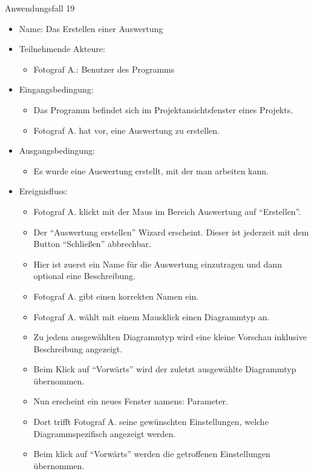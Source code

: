 \begin{description}
\item[Anwendungsfall 19]
\end{description}
 
\begin{itemize}
\item Name: Das Erstellen einer Auswertung
\item Teilnehmende Akteure:
\begin{itemize}
\item Fotograf A.: Benutzer des Programms
\end{itemize}
\item Eingangsbedingung:
\begin{itemize}
\item Das Programm befindet sich im Projektansichtsfenster eines Projekts.
\item Fotograf A. hat vor, eine Auswertung zu erstellen.
\end{itemize}
\item Ausgangsbedingung:
\begin{itemize}
\item Es wurde eine Auswertung erstellt, mit der man arbeiten kann.
\end{itemize}
\item Ereignisfluss:
\begin{itemize}
\item Fotograf A. klickt mit der Maus im Bereich Auswertung auf "`Erstellen"'.
\item Der "`Auswertung erstellen"' Wizard erscheint. Dieser ist jederzeit mit dem Button "`Schließen"' abbrechbar.
\item Hier ist zuerst ein Name für die Auswertung einzutragen und dann optional eine Beschreibung.
\item Fotograf A. gibt einen korrekten Namen ein.
\item Fotograf A. wählt mit einem Mausklick einen Diagrammtyp an.
\item Zu jedem ausgewählten Diagrammtyp wird eine kleine Vorschau inklusive Beschreibung angezeigt.
\item Beim Klick auf "`Vorwärts"' wird der zuletzt ausgewählte Diagrammtyp übernommen.
\item Nun erscheint ein neues Fenster namens: Parameter.
\item Dort trifft Fotograf A. seine gewünschten Einstellungen, welche Diagrammspezifisch angezeigt werden. 
\item Beim klick auf "`Vorwärts"' werden die getroffenen Einstellungen übernommen.

\end{itemize}
\end{itemize}

